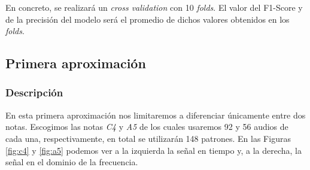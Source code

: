 \documentclass[12pt]{article}
\begin{document}
En concreto, se realizará un \textit{cross validation} con 10 \textit{folds}. El valor del F1-Score y de la precisión
del modelo será el promedio de dichos valores obtenidos en los \textit{folds}.

\subsection{Primera aproximación}
\label{Primera aproximación}

\subsubsection{Descripción}
En esta primera aproximación nos limitaremos a diferenciar únicamente entre dos notas. 
Escogimos las notas \textit{C4} y \textit{A5} de los cuales usaremos 92 y 56 audios de cada una, respectivamente, en total
se utilizarán 148 patrones. En las Figuras \ref{fig:c4} y \ref{fig:a5} podemos ver a la izquierda la señal en tiempo y, a la derecha,
la señal en el dominio de la frecuencia.
\end{document}
